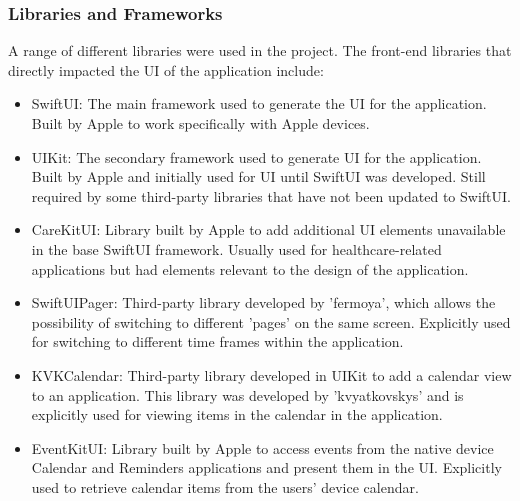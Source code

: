 	            \subsubsection{Libraries and Frameworks}
	            
	                A range of different libraries were used in the project.  The front-end libraries that directly impacted the UI of the application include:
	                \begin{itemize}[noitemsep]
	                    \item SwiftUI: The main framework used to generate the UI for the application.  Built by Apple to work specifically with Apple devices.
	                    \item UIKit: The secondary framework used to generate UI for the application.  Built by Apple and initially used for UI until SwiftUI was developed.  Still required by some third-party libraries that have not been updated to SwiftUI.
	                    \item CareKitUI: Library built by Apple to add additional UI elements unavailable in the base SwiftUI framework.  Usually used for healthcare-related applications but had elements relevant to the design of the application.
	                    \item SwiftUIPager: Third-party library developed by 'fermoya', which allows the possibility of switching to different 'pages' on the same screen.  Explicitly used for switching to different time frames within the application\cite{fermoya}.
	                    \item KVKCalendar: Third-party library developed in UIKit to add a calendar view to an application.  This library was developed by 'kvyatkovskys' and is explicitly used for viewing items in the calendar in the application\cite{kvyatkovskys}.
	                    \item EventKitUI: Library built by Apple to access events from the native device Calendar and Reminders applications and present them in the UI.  Explicitly used to retrieve calendar items from the users' device calendar.
	                \end{itemize}
	                
